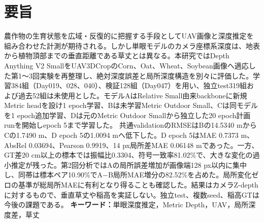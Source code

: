 \chapter*{要旨}
農作物の生育状態を広域・反復的に把握する手段としてUAV画像と深度推定を組み合わせた計測が期待される。しかし単眼モデルのカメラ座標系深度は、地表から植物頂部までの垂直距離である草丈とは異なる。本研究ではDepth Anything V2 SmallをUAV3DCropのCorn、Oat、Wheat、Soybean画像へ適応した第1〜3回実験を再整理し、絶対深度誤差と局所深度構造を別々に評価した。学習384組（Day019、028、040）、検証128組（Day047）を用い、独立test319組および過去52組は未使用とした。モデルAはRelative Small由来backboneに新規Metric headを設け1 epoch学習、Bは未学習Metric Outdoor Small、Cは同モデルを1 epoch追加学習、Dは元のMetric Outdoor Smallから独立した20 epoch計画runを開始しepoch 5まで学習した。
共通validationのRMSEはBの14.5340 mからCの1.7490 m、D epoch 5の1.0094 mへ低下した。D epoch 5はMAE 0.7373 m、AbsRel 0.03694、Pearson 0.9919、14 px局所差MAE 0.06148 mであった。一方、GT差20 cm以上の標本では振幅比0.3304、符号一致率81.02\%で、大きな変化の過小推定が残った。第2回分析ではAの局所誤差増加が画像端128 px以内に集中し、同帯は標本ペア10.90\%でA−B局所MAE増分の82.52\%を占めた。局所変化ゼロの基準が総局所MAEに有利となり得ることも確認した。結果はカメラZ-depthに対するもので、垂直草丈や稲高を実証しない。独立test、複数seed、稲高GTは今後の課題である。
\noindent\textbf{キーワード：}単眼深度推定，Metric Depth，UAV，局所深度差，草丈
